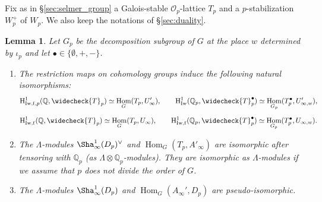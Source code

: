 \documentclass[12pt]{amsart}
\newcommand\bQ{\mathbb{Q}}
\newcommand\Qp{{\mathbb{Q}_p}}
\newcommand\cO{\mathcal{O}}
\DeclareMathOperator{\Hom}{Hom}
\newcommand{\HH}{\mathrm{H}}
\newcommand{\ff}{\mathrm{f}}
\newcommand{\Iw}{\mathrm{Iw}}
\theoremstyle{defstyle}
\theoremstyle{thmstyle}
\newtheorem{lemme}[subsubsection]{Lemma}
\begin{document}
Fix as in \S\ref{sec:selmer_group} a Galois-stable $\cO_p$-lattice $T_p$ and a $p$-stabilization $W_p^+$ of $W_p$. We also keep the notations of \S\ref{sec:duality}. 
\begin{lemme}\label{lem:relation_cohomologie_et_unités}
	Let $G_p$ be the decomposition subgroup of $G$ at the place $w$ determined by $\iota_p$ and let $\bullet \in \{\emptyset,+,-\}$. 
	\begin{enumerate}
		\item The restriction maps on cohomology groups induce the following natural isomorphisms: 
	$$ \HH^1_{\Iw,\ff,p}(\bQ,\widecheck{T}_p) \simeq \Hom_G(T_p,U'_\infty), \qquad \HH^1_{\Iw}(\bQ_p,\widecheck{T}^{\bullet}_p) \simeq \Hom_{G_p}(T^{\bullet}_p,U'_{\infty,w}),$$ 
	$$ \HH^1_{\Iw,\ff}(\bQ,\widecheck{T}_p) \simeq \Hom_G(T_p,U_\infty), \qquad \HH^1_{\Iw,\ff}(\bQ_p,\widecheck{T}^{\bullet}_p) \simeq \Hom_{G_p}(T^{\bullet}_p,U_{\infty,w}).$$
	\item The $\Lambda$-modules $\Sha_\infty^1(D_p)^\vee$ and $\Hom_G(T_p,A'_\infty)$ are isomorphic after tensoring with $\Qp$ (as $\Lambda \otimes \Qp$-modules). They are isomorphic as $\Lambda$-modules if we assume that $p$ does not divide the order of $G$. 
	\item The $\Lambda$-modules $\Sha_\infty^1(D_p)$ and $\Hom_G(A_\infty',D_p)$ are pseudo-isomorphic.
\end{enumerate} 
\end{lemme}
\end{document}
